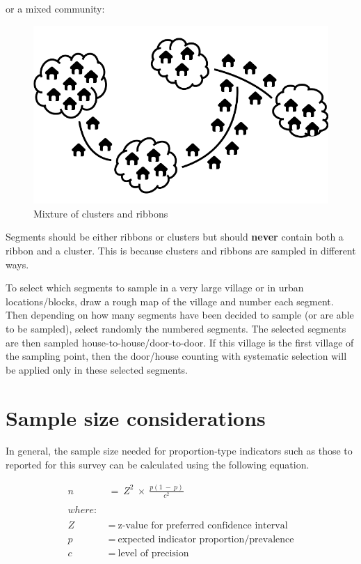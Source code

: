 \documentclass[12pt,a4paper]{book}
\theoremstyle{definition}
\theoremstyle{definition}
\theoremstyle{definition}
\theoremstyle{remark}
\begin{document}
or a mixed community:

\begin{figure}[H]

{\centering \includegraphics[width=9.72in]{figures/stage2sample5} 

}

\caption{Mixture of clusters and ribbons}\label{fig:sample19}
\end{figure}

Segments should be either ribbons or clusters but should \textbf{never}
contain both a ribbon and a cluster. This is because clusters and
ribbons are sampled in different ways.

To select which segments to sample in a very large village or in urban
locations/blocks, draw a rough map of the village and number each
segment. Then depending on how many segments have been decided to sample
(or are able to be sampled), select randomly the numbered segments. The
selected segments are then sampled house-to-house/door-to-door. If this
village is the first village of the sampling point, then the door/house
counting with systematic selection will be applied only in these
selected segments.

\hypertarget{samplesize}{%
\section{Sample size considerations}\label{samplesize}}

In general, the sample size needed for proportion-type indicators such
as those to reported for this survey can be calculated using the
following equation.

\[\begin{aligned}
n & ~ = ~ Z^2 ~ \times ~ \frac{p(1 ~ - ~ p)}{c ^ 2} \\
\\
where: & \\
\\
Z & ~ = ~ \text{z-value for preferred confidence interval} \\
p & ~ = ~ \text{expected indicator proportion/prevalence} \\
c & ~ = ~ \text{level of precision}
\end{aligned}\]
\end{document}
